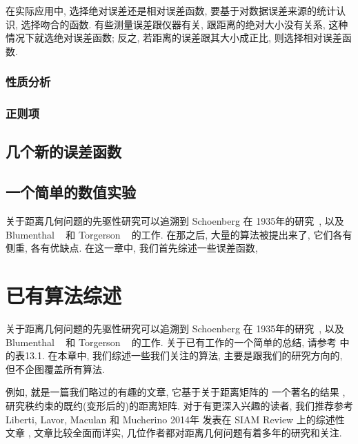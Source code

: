 \documentclass{CASthesis_zzk}
\begin{document}
在实际应用中, 选择绝对误差还是相对误差函数, 要基于对数据误差来源的统计认识,
选择吻合的函数.
有些测量误差跟仪器有关, 跟距离的绝对大小没有关系, 这种情况下就选绝对误差函数;
反之, 若距离的误差跟其大小成正比, 则选择相对误差函数.

\subsection{性质分析}


\subsection{正则项}

\section{几个新的误差函数}
\label{sec:newfun}



\section{一个简单的数值实验}
\label{sec:funnuc}




关于距离几何问题的先驱性研究可以追溯到 Schoenberg 在 
1935年的研究~\cite{Schoenberg1935}, 
以及 Blumenthal ~\cite{Blumenthal1953} 和 Torgerson ~\cite{Torgerson1958} 的工作.
在那之后, 大量的算法被提出来了, 它们各有侧重, 各有优缺点. 
在这一章中, 我们首先综述一些误差函数, 


\chapter{已有算法综述}
\label{cha:algrev}

关于距离几何问题的先驱性研究可以追溯到 Schoenberg 在 
1935年的研究~\cite{Schoenberg1935}, 
以及 Blumenthal ~\cite{Blumenthal1953} 和 Torgerson ~\cite{Torgerson1958} 的工作.
关于已有工作的一个简单的总结, 请参考 \cite{Fang2013} 中的表13.1. 
在本章中, 我们综述一些我们关注的算法, 主要是跟我们的研究方向的, 
但不企图覆盖所有算法.

例如, \cite{Qi2012} 就是一篇我们略过的有趣的文章, 它基于关于距离矩阵的
一个著名的结果 \cite{Schoenberg1935}, 研究秩约束的既约(变形后的)的距离矩阵.
对于有更深入兴趣的读者, 我们推荐参考 Liberti, Lavor, Maculan 和 Mucherino 2014年
发表在 SIAM Review 上的综述性文章 \cite{Maculan2014}, 文章比较全面而详实,
几位作者都对距离几何问题有着多年的研究和关注.
\end{document}
